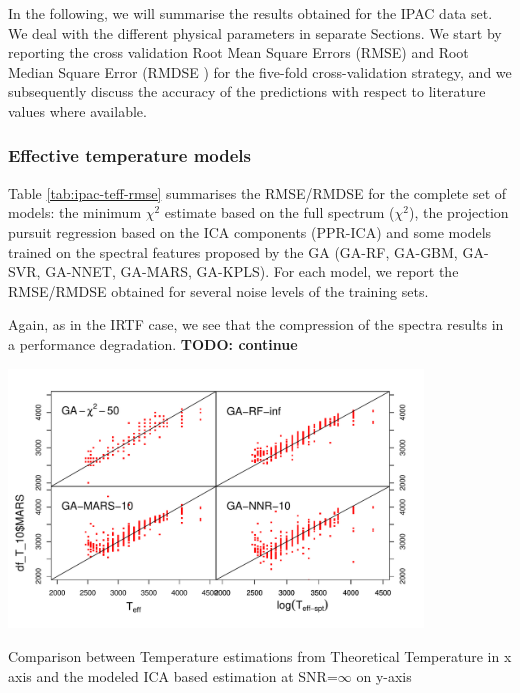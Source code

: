 
In the following, we will summarise the results obtained for the IPAC
data set. We deal with the different physical parameters in separate
Sections. We start by reporting the cross validation Root Mean Square
Errors (RMSE) and Root Median Square Error (RMDSE ) for the five-fold
cross-validation strategy, and we subsequently discuss the accuracy of
the predictions with respect to literature values where available.

\subsubsection{Effective temperature models}

Table \ref{tab:ipac-teff-rmse} summarises the RMSE/RMDSE for the
complete set of models: the minimum $\chi^2$ estimate based on the
full spectrum ($\chi^2$), the projection pursuit regression based on
the ICA components (PPR-ICA) and some models trained on the spectral
features proposed by the GA (GA-RF, GA-GBM, GA-SVR, GA-NNET, GA-MARS,
GA-KPLS). For each model, we report the RMSE/RMDSE obtained for
several noise levels of the training sets.

Again, as in the IRTF case, we see that the compression of the spectra
results in a performance degradation. {\bf TODO: continue} 

\begin {figure*}
 \centering \includegraphics[width=11cm]{figs/ipac-teff.pdf}

\caption{Comparison
 between Temperature estimations from Theoretical Temperature in x
 axis and the modeled ICA based estimation at SNR=$\infty$ on
 y-axis} \label{fig:ipac_teff}
\end {figure*}





